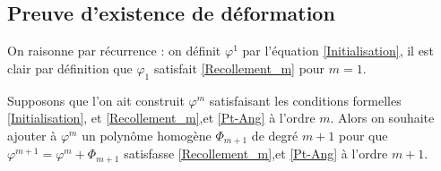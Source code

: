 \documentclass[a4paper,10pt,draft]{article}
\begin{document}
\subsection{Preuve d'existence de déformation}
On raisonne par récurrence : on définit $\varphi^1$ par l'équation \eqref{Initialisation}, il est clair par définition que $\varphi_1$ satisfait \eqref{Recollement_m} pour $m=1$.

Supposons que l'on ait construit $\varphi^m$ satisfaisant les conditions formelles \eqref{Initialisation}, et \eqref{Recollement_m},et \eqref{Pt-Ang} à l'ordre $m$. Alors on souhaite ajouter à $\varphi^m$ un polynôme homogène $\Phi_{m+1}$ de degré $m+1$ pour que $\varphi^{m+1} = \varphi^m + \Phi_{m+1}$ satisfasse  \eqref{Recollement_m},et \eqref{Pt-Ang} à l'ordre $m+1$.
\end{document}
